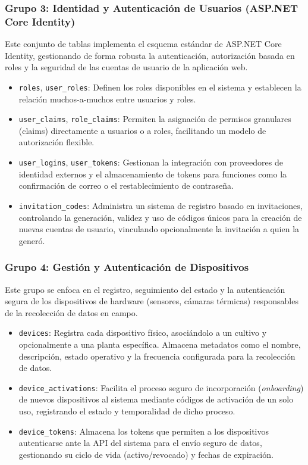 \subsubsection*{Grupo 3: Identidad y Autenticación de Usuarios (ASP.NET Core Identity)}
Este conjunto de tablas implementa el esquema estándar de ASP.NET Core Identity, gestionando de forma robusta la autenticación, autorización basada en roles y la seguridad de las cuentas de usuario de la aplicación web.
\begin{itemize}
    \item \texttt{roles}, \texttt{user\_roles}: Definen los roles disponibles en el sistema y establecen la relación muchos-a-muchos entre usuarios y roles.
    \item \texttt{user\_claims}, \texttt{role\_claims}: Permiten la asignación de permisos granulares (claims) directamente a usuarios o a roles, facilitando un modelo de autorización flexible.
    \item \texttt{user\_logins}, \texttt{user\_tokens}: Gestionan la integración con proveedores de identidad externos y el almacenamiento de tokens para funciones como la confirmación de correo o el restablecimiento de contraseña.
    \item \texttt{invitation\_codes}: Administra un sistema de registro basado en invitaciones, controlando la generación, validez y uso de códigos únicos para la creación de nuevas cuentas de usuario, vinculando opcionalmente la invitación a quien la generó.
\end{itemize}

\subsubsection*{Grupo 4: Gestión y Autenticación de Dispositivos}
Este grupo se enfoca en el registro, seguimiento del estado y la autenticación segura de los dispositivos de hardware (sensores, cámaras térmicas) responsables de la recolección de datos en campo.
\begin{itemize}
    \item \texttt{devices}: Registra cada dispositivo físico, asociándolo a un cultivo y opcionalmente a una planta específica. Almacena metadatos como el nombre, descripción, estado operativo y la frecuencia configurada para la recolección de datos.
    \item \texttt{device\_activations}: Facilita el proceso seguro de incorporación (\textit{onboarding}) de nuevos dispositivos al sistema mediante códigos de activación de un solo uso, registrando el estado y temporalidad de dicho proceso.
    \item \texttt{device\_tokens}: Almacena los tokens que permiten a los dispositivos autenticarse ante la API del sistema para el envío seguro de datos, gestionando su ciclo de vida (activo/revocado) y fechas de expiración.
\end{itemize}

